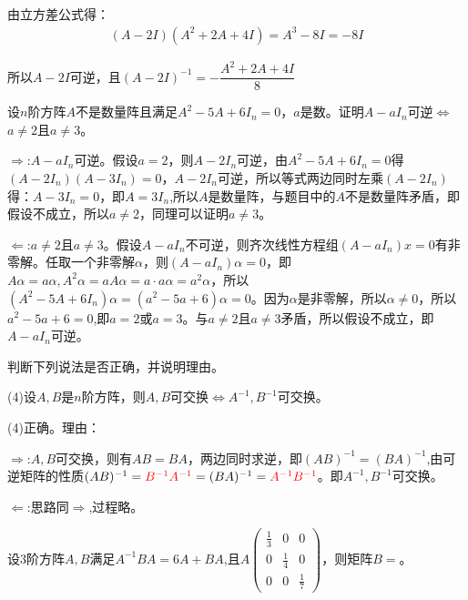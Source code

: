 \documentclass[a4paper]{report}
\begin{document}
\begin{zhengming}
由立方差公式得：
\begin{align*}
(A-2I)(A^2+2A+4I)=A^3-8I=-8I
\end{align*}

所以$A-2I$可逆，且$(A-2I)^{-1}=-\dfrac{A^2+2A+4I}{8}$
\end{zhengming}

\EX 设$n$阶方阵$A$不是数量阵且满足$A^2-5A+6I_n=0$，$a$是数。证明$A-aI_n$可逆$\Leftrightarrow$ $a\neq 2$且$a\neq3$。

\begin{zhengming}
$\Rightarrow$:$A-aI_n$可逆。假设$a=2$，则$A-2I_n$可逆，由$A^2-5A+6I_n=0$得$(A-2I_n)(A-3I_{n})=0$，$A-2I_n$可逆，所以等式两边同时左乘$(A-2I_n)$得：$A-3I_{n}=0$，即$A=3I_{n}$,所以$A$是数量阵，与题目中的$A$不是数量阵矛盾，即假设不成立，所以$a\neq 2$，同理可以证明$a\neq 3$。

$\Leftarrow$:$a\neq 2$且$a\neq3$。假设$A-aI_n$不可逆，则齐次线性方程组$(A-aI_n)x=0$有非零解。任取一个非零解$\alpha$，则$(A-aI_n)\alpha=0$，即$A\alpha=a\alpha,A^2\alpha=aA\alpha=a\cdot a\alpha=a^2\alpha$，所以$(A^2-5A+6I_{n})\alpha=(a^2-5a+6)\alpha=0$。因为$\alpha$是非零解，所以$\alpha\neq 0$，所以$a^2-5a+6=0$,即$a=2$或$a=3$。与$a\neq 2$且$a\neq 3$矛盾，所以假设不成立，即$A-aI_n$可逆。
\end{zhengming}

\EX 判断下列说法是否正确，并说明理由。

(4)设$A,B$是$n$阶方阵，则$A,B$可交换$\Leftrightarrow A^{-1},B^{-1}$可交换。

\begin{jie}
(4)正确。理由：

$\Rightarrow$:$A,B$可交换，则有$AB=BA$，两边同时求逆，即$(AB)^{-1}=(BA)^{-1}$,由可逆矩阵的性质$(AB)^{-1}=\textcolor[rgb]{1.00,0.00,0.00}{B^{-1}A^{-1}}=(BA)^{-1}=\textcolor[rgb]{1.00,0.00,0.00}{A^{-1}B^{-1}}$。即$A^{-1},B^{-1}$可交换。

$\Leftarrow$:思路同$\Rightarrow$,过程略。
\end{jie}

\EX 设3阶方阵$A,B$满足$A^{-1}BA=6A+BA$,且$A
\begin{pmatrix}
\frac{1}{3}&0&0\\
0&\frac{1}{4}&0\\
0&0&\frac{1}{7}
\end{pmatrix}
$，则矩阵$B=$\underline{\hphantom{~~~~~~~~~~~}}。
\end{document}
